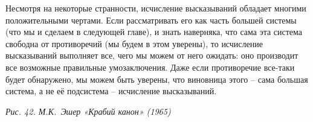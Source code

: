 \documentclass[../main.tex]{subfiles}
\begin{document}
Несмотря на некоторые странности, исчисление высказываний обладает многими положительными чертами. Если рассматривать его как часть большей системы (что мы и сделаем в следующей главе), и знать наверняка, что сама эта система свободна от противоречий (мы будем в этом уверены), то исчисление высказываний выполняет все, чего мы можем от него ожидать: оно производит все возможные правильные умозаключения. Даже если противоречие все-таки будет обнаружено, мы можем быть уверены, что виновница этого \--- сама большая система, а не её подсистема \--- исчисление высказываний.

\emph{Рис. 42. М.К.~Эшер «Крабий канон» (1965)}
\end{document}
